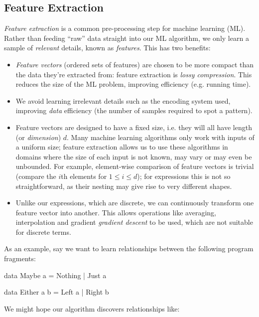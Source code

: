 \subsection{Feature Extraction}

\emph{Feature extraction} is a common pre-processing step for machine learning
(ML). Rather than feeding ``raw'' data straight into our ML algorithm, we only
learn a sample of \emph{relevant} details, known as \emph{features}. This has
two benefits:

\begin{itemize}
\item \emph{Feature vectors} (ordered sets of features) are chosen to be more
  compact than the data they're extracted from: feature extraction is
  \emph{lossy compression}. This reduces the size of the ML problem, improving
  efficiency (e.g. running time).
\item We avoid learning irrelevant details such as the encoding system used,
  improving \emph{data} efficiency (the number of samples required to spot a
  pattern).
\item Feature vectors are designed to have a fixed size, i.e. they will all have
  length (or \emph{dimension}) $d$. Many machine learning algorithms only work
  with inputs of a uniform size; feature extraction allows us to use these
  algorithms in domains where the size of each input is not known, may vary or
  may even be unbounded. For example, element-wise comparison of feature vectors
  is trivial (compare the $i$th elements for $1 \leq i \leq d$); for expressions
  this is not so straightforward, as their nesting may give rise to very
  different shapes.
\item Unlike our expressions, which are discrete, we can continuously transform
  one feature vector into another. This allows operations like averaging,
  interpolation and gradient \emph{gradient descent} to be used, which are not
  suitable for discrete terms.
\end{itemize}

As an example, say we want to learn relationships between the following program
fragments:

\begin{haskell}
data Maybe a = Nothing | Just a

data Either a b = Left a | Right b
\end{haskell}

We might hope our algorithm discovers relationships like:

